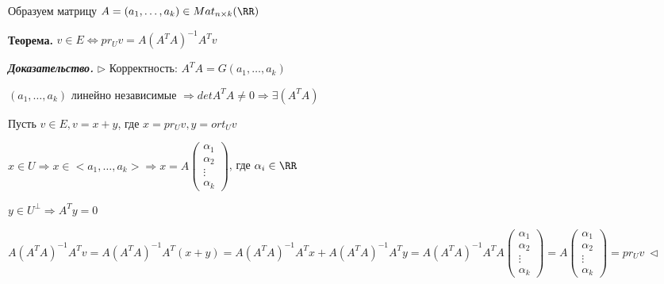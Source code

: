 Образуем матрицу $A = (a_1, \dots, a_k) \in Mat_{n \times k} (\RR)$

\bigskip
\textbf{Теорема.} $v \in E \Leftrightarrow pr_U v = A (A^T A)^{-1} A^T v$

\bigskip
\textbf{\textit{Доказательство.}} $\rhd$ Корректность: $A^T A = G(a_1, \dots, a_k)$

$(a_1, \dots, a_k)$ линейно независимые $\Rightarrow det A^T A \neq 0 \Rightarrow \exists (A^T A)$

Пусть $v \in E, v = x + y$, где $x = pr_U v, y = ort_U v$

$x \in U \Rightarrow x \in <a_1, \dots, a_k> \Rightarrow x  = A \begin{pmatrix} \alpha_1 \\ \alpha_2 \\ \vdots \\ \alpha_k \end{pmatrix}$, где $\alpha_i \in \RR$

$y \in U^{\bot} \Rightarrow A^T y = 0$

$A (A^T A)^{-1} A^T v = A (A^T A)^{-1} A^T (x + y) = A (A^T A)^{-1} A^T x + A (A^T A)^{-1} A^T y = A (A^T A)^{-1} A^T A \begin{pmatrix} \alpha_1 \\ \alpha_2 \\ \vdots \\ \alpha_k \end{pmatrix} = A \begin{pmatrix} \alpha_1 \\ \alpha_2 \\ \vdots \\ \alpha_k \end{pmatrix} = pr_U v \ \lhd$


